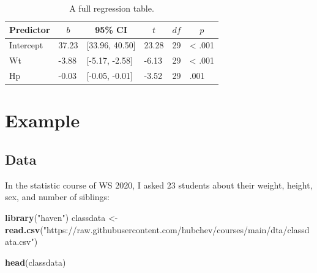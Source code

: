 \documentclass[
  doc]{apa6}
\newenvironment{Shaded}{\begin{snugshade}}{\end{snugshade}}
\newcommand{\AttributeTok}[1]{\textcolor[rgb]{0.13,0.29,0.53}{#1}}
\newcommand{\FunctionTok}[1]{\textcolor[rgb]{0.13,0.29,0.53}{\textbf{#1}}}
\newcommand{\NormalTok}[1]{#1}
\newcommand{\OtherTok}[1]{\textcolor[rgb]{0.56,0.35,0.01}{#1}}
\newcommand{\SpecialCharTok}[1]{\textcolor[rgb]{0.81,0.36,0.00}{\textbf{#1}}}
\newcommand{\StringTok}[1]{\textcolor[rgb]{0.31,0.60,0.02}{#1}}
\begin{document}
\begin{Shaded}
\end{Shaded}

\begin{table}[tbp]

\begin{center}
\begin{threeparttable}

\caption{\label{tab:unnamed-chunk-7}A full regression table.}

\begin{tabular}{llllll}
\toprule
Predictor & \multicolumn{1}{c}{$b$} & \multicolumn{1}{c}{95\% CI} & \multicolumn{1}{c}{$t$} & \multicolumn{1}{c}{$\mathit{df}$} & \multicolumn{1}{c}{$p$}\\
\midrule
Intercept & 37.23 & {}[33.96, 40.50] & 23.28 & 29 & < .001\\
Wt & -3.88 & {}[-5.17, -2.58] & -6.13 & 29 & < .001\\
Hp & -0.03 & {}[-0.05, -0.01] & -3.52 & 29 & .001\\
\bottomrule
\end{tabular}

\end{threeparttable}
\end{center}

\end{table}

\newpage

\hypertarget{example}{%
\section{Example}\label{example}}

\hypertarget{data}{%
\subsection{Data}\label{data}}

In the statistic course of WS 2020, I asked 23 students about their weight, height, sex, and number of siblings:

\begin{Shaded}
\begin{Highlighting}[]
\FunctionTok{library}\NormalTok{(}\StringTok{"haven"}\NormalTok{)}
\NormalTok{classdata }\OtherTok{\textless{}{-}} \FunctionTok{read.csv}\NormalTok{(}\StringTok{"https://raw.githubusercontent.com/hubchev/courses/main/dta/classdata.csv"}\NormalTok{)}

\FunctionTok{head}\NormalTok{(classdata)}
\end{Highlighting}
\end{Shaded}
\end{document}
